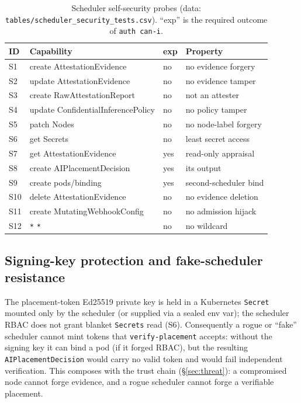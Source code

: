 \begin{table}[t]
  \centering
  \caption{Scheduler self-security probes (data:
  \texttt{tables/scheduler\_security\_tests.csv}). ``exp'' is the required
  outcome of \texttt{auth can-i}.}
  \label{tab:scheduler-security}
  \footnotesize
  \begin{tabular}{@{}llll@{}}
    \toprule
    \textbf{ID} & \textbf{Capability} & \textbf{exp} & \textbf{Property} \\
    \midrule
    S1  & create AttestationEvidence      & no  & no evidence forgery \\
    S2  & update AttestationEvidence      & no  & no evidence tamper \\
    S3  & create RawAttestationReport     & no  & not an attester \\
    S4  & update ConfidentialInferencePolicy & no & no policy tamper \\
    S5  & patch Nodes                     & no  & no node-label forgery \\
    S6  & get Secrets                     & no  & least secret access \\
    S7  & get AttestationEvidence         & yes & read-only appraisal \\
    S8  & create AIPlacementDecision      & yes & its output \\
    S9  & create pods/binding             & yes & second-scheduler bind \\
    S10 & delete AttestationEvidence      & no  & no evidence deletion \\
    S11 & create MutatingWebhookConfig    & no  & no admission hijack \\
    S12 & \texttt{*} \texttt{*}           & no  & no wildcard \\
    \bottomrule
  \end{tabular}
\end{table}

\subsection{Signing-key protection and fake-scheduler resistance}
The placement-token Ed25519 private key is held in a Kubernetes \texttt{Secret}
mounted only by the scheduler (or supplied via a sealed env var); the scheduler
RBAC does not grant blanket \texttt{Secrets} read (S6). Consequently a rogue or
``fake'' scheduler cannot mint tokens that \texttt{verify-placement} accepts:
without the signing key it can bind a pod (if it forged RBAC), but the resulting
\texttt{AIPlacementDecision} would carry no valid token and would fail
independent verification. This composes with the trust chain
(\S\ref{sec:threat}): a compromised node cannot forge evidence, and a rogue
scheduler cannot forge a verifiable placement.

